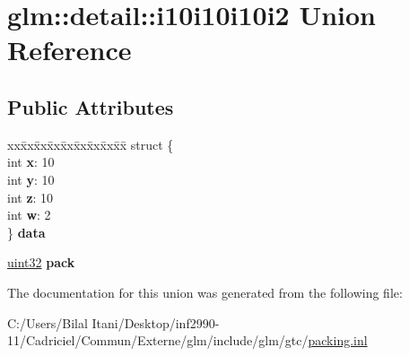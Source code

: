 \hypertarget{unionglm_1_1detail_1_1i10i10i10i2}{}\section{glm\+:\+:detail\+:\+:i10i10i10i2 Union Reference}
\label{unionglm_1_1detail_1_1i10i10i10i2}
\subsection*{Public Attributes}
\begin{DoxyCompactItemize}
\item 
\begin{tabbing}
xx\=xx\=xx\=xx\=xx\=xx\=xx\=xx\=xx\=\kill
struct \{\\
\>int {\bfseries x}: 10\\
\>int {\bfseries y}: 10\\
\>int {\bfseries z}: 10\\
\>int {\bfseries w}: 2\\
\} {\bfseries data}\hypertarget{unionglm_1_1detail_1_1i10i10i10i2_ab4c1d4602d19f6bdfdf850ff892cd0c7}{}\label{unionglm_1_1detail_1_1i10i10i10i2_ab4c1d4602d19f6bdfdf850ff892cd0c7}
\\

\end{tabbing}\item 
\hyperlink{group__gtc__type__precision_ga202b6a53c105fcb7e531f9b443518451}{uint32} {\bfseries pack}\hypertarget{unionglm_1_1detail_1_1i10i10i10i2_a24e2dc324c86589d568dc330904c859a}{}\label{unionglm_1_1detail_1_1i10i10i10i2_a24e2dc324c86589d568dc330904c859a}

\end{DoxyCompactItemize}


The documentation for this union was generated from the following file\+:\begin{DoxyCompactItemize}
\item 
C\+:/\+Users/\+Bilal Itani/\+Desktop/inf2990-\/11/\+Cadriciel/\+Commun/\+Externe/glm/include/glm/gtc/\hyperlink{packing_8inl}{packing.\+inl}\end{DoxyCompactItemize}
